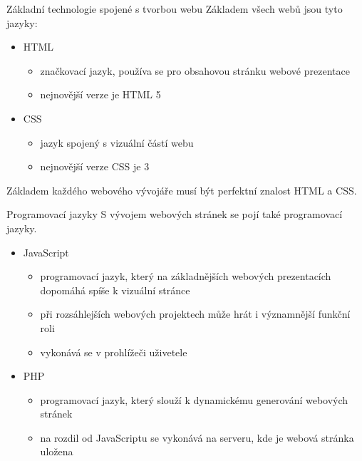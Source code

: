\documentclass[fyma,pdf,final]{prosper}
\begin{document}
	\begin{slide}{Základní technologie spojené s tvorbou webu}
		Základem všech webů jsou tyto jazyky:
		\begin{itemize}
			\item HTML
				\begin{itemize}
					\item značkovací jazyk, používa se pro obsahovou stránku webové prezentace
					\item nejnovější verze je HTML 5
				\end{itemize}
			\item CSS
				\begin{itemize}
					\item jazyk spojený s vizuální částí webu
					\item nejnovější verze CSS je 3

				\end{itemize}
		\end{itemize}
		Základem každého webového vývojáře musí být perfektní znalost HTML a CSS.
	\end{slide}

	\begin{slide}{Programovací jazyky}
	S vývojem webových stránek se pojí také programovací jazyky.
		\begin{itemize}
			\item JavaScript
				\begin{itemize}
					\item programovací jazyk, který na základnějších webových prezentacích dopomáhá spíše k vizuální stránce
					\item při rozsáhlejších webových projektech může hrát i významnější funkční roli
					\item vykonává se v prohlížeči uživetele
				\end{itemize}
			\item PHP
				\begin{itemize}
					\item programovací jazyk, který slouží k dynamickému generování webových stránek
					\item na rozdil od JavaScriptu se vykonává na serveru, kde je webová stránka uložena
				\end{itemize}
		\end{itemize}
	\end{slide}
\end{document}
